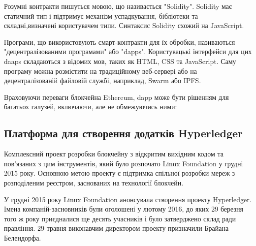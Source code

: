 \documentclass{lib/styles/default-style}
\begin{document}

    Розумні контракти пишуться мовою, що називається "Solidity". Solidity має статичний тип і підтримує механізм успадкування,
    бібліотеки та складні,визначені користувачем типи. Синтаксис Solidity схожий на JavaScript.

    Програми, що використовують смарт-контракти для їх обробки, називаються "децентралізованими програмами" або "dapps".
    Користувацькі інтерфейси для цих daaps складаються з відомих мов, таких як HTML, CSS та JavaScript.
    Саму програму можна розмістити на традиційному веб-сервері або на децентралізованій файловій службі, наприклад, Swarm або IPFS.

    Враховуючи переваги блокчейна Ethereum, dapp може бути рішенням для багатьох галузей, включаючи, але не обмежуючись ними:


\subsection{Платформа для створення додатків Hyperledger}

    Комплексний проект розробки блокчейну з відкритим вихідним кодом та пов'язаних з цим інструментів,
    який було розпочато Linux Foundation у грудні 2015 року. Основною метою проекту є підтримка спільної
    розробки мереж з розподіленим реєстром, заснованих на технології блокчейн.
    
    У грудні 2015 року Linux Foundation анонсувала створення проекту Hyperledger.
    Імена компаній-засновників були оголошені у лютому 2016, до яких 29 березня того ж року приєдналися ще
    десять учасників і було затверджено склад ради правління. 29 травня виконавчим директором проекту призначили Брайана Белендорфа.
    
\end{document}
